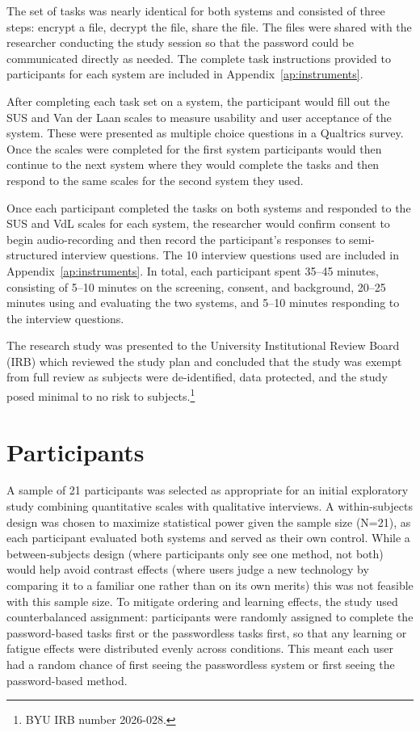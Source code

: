 The set of tasks was nearly identical for both systems and consisted of three steps: encrypt a file, decrypt the file, share the file. The files were shared with the researcher conducting the study session so that the password could be communicated directly as needed. The complete task instructions provided to participants for each system are included in Appendix~\ref{ap:instruments}.

After completing each task set on a system, the participant would fill out the SUS and Van der Laan scales to measure usability and user acceptance of the system. These were presented as multiple choice questions in a Qualtrics\texttrademark{} survey. Once the scales were completed for the first system participants would then continue to the next system where they would complete the tasks and then respond to the same scales for the second system they used.

Once each participant completed the tasks on both systems and responded to the SUS and VdL scales for each system, the researcher would confirm consent to begin audio-recording and then record the participant's responses to semi-structured interview questions. The 10 interview questions used are included in Appendix~\ref{ap:instruments}. In total, each participant spent 35--45 minutes, consisting of 5--10 minutes on the screening, consent, and background, 20--25 minutes using and evaluating the two systems, and 5--10 minutes responding to the interview questions.

The research study was presented to the University Institutional Review Board (IRB) which reviewed the study plan and concluded that the study was exempt from full review as subjects were de-identified, data protected, and the study posed minimal to no risk to subjects.\footnote{BYU IRB number 2026-028.}

\section{Participants}
\label{sec:participants}

A sample of 21 participants was selected as appropriate for an initial exploratory study combining quantitative scales with qualitative interviews. A within-subjects design was chosen to maximize statistical power given the sample size (N=21), as each participant evaluated both systems and served as their own control. While a between-subjects design (where participants only see one method, not both) would help avoid contrast effects (where users judge a new technology by comparing it to a familiar one rather than on its own merits) this was not feasible with this sample size. To mitigate ordering and learning effects, the study used counterbalanced assignment: participants were randomly assigned to complete the password-based tasks first or the passwordless tasks first, so that any learning or fatigue effects were distributed evenly across conditions. This meant each user had a random chance of first seeing the passwordless system or first seeing the password-based method.

